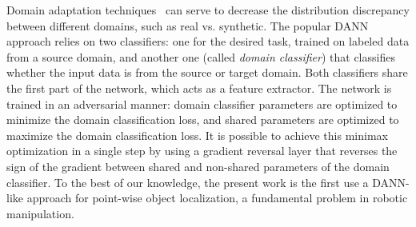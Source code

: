 \documentclass[letterpaper, 10 pt, conference]{ieeeconf}  %
\newcommand{\phil}[1]{\textcolor{blue}{#1}}
\begin{document}
Domain adaptation techniques~\cite{wang2018deep,csurka2017domain} can serve to decrease the distribution discrepancy between different domains, such as real vs. synthetic. The popular DANN~\cite{ganin2016domain} approach relies on two classifiers: one for the desired task, trained on labeled data from a source domain, and another one (called \emph{domain classifier}) that classifies whether the input data is from the source or target domain. Both classifiers share the first part of the network, which acts as a feature extractor. The network is trained in an adversarial manner: domain classifier parameters are optimized to minimize the domain classification loss, and shared parameters are optimized to maximize the domain classification loss. It is possible to achieve this minimax optimization in a single step by using a gradient reversal layer that reverses the sign of the gradient between shared and non-shared parameters of the domain classifier. To the best of our knowledge, the present work is the first use a DANN-like approach for point-wise object localization, a fundamental problem in robotic manipulation. 
\end{document}
